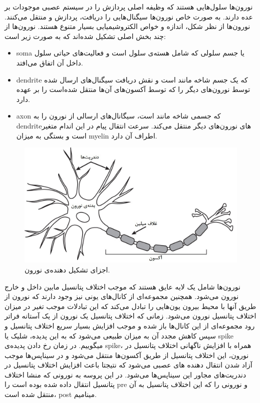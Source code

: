 \documentclass[12pt]{report}
\begin{document}
	نورون‌ها سلول‌هایی هستند که وظیفه اصلی پردازش را در سیستم عصبی موجودات بر عده دارند. به صورت خاص نورون‌ها سیگنال‌هایی را دریافت، پردازش و منتقل می‌کنند. نورون‌ها از نظر شکل، اندازه و خواص الکتروشیمیایی بسیار متنوع هستند. نورون‌ها از چند بخش اصلی تشکیل شده‌اند که به صورت زیر است:
	\begin{itemize}
		\item \gls{soma} یا جسم سلولی که شامل هسته‌ی سلول است و فعالیت‌های حیاتی سلول داخل آن اتفاق می‌افتد.
		\item \gls{dendrite} که یک جسم شاخه مانند است و نقش دریافت سیگنال‌های ارسال شده توسط نورون‌های دیگر را که توسط آکسون‌های آن‌ها منتقل شده‌است را بر عهده دارد.
		\item \gls{axon} که جسمی شاخه مانند است، سیگانال‌های ارسالی از نورون را به \gls{dendrite}‌های نورون‌های دیگر منتقل می‌کند. سرعت انتقال پیام‌‌ در این اندام متغیر است و بستگی به میزان \gls{myelin} اطراف آن دارد.
	\end{itemize}
	
	\begin{figure}[H]
		\centering
		\includegraphics[width=0.7\linewidth]{neuron.jpg}
		\caption[NS]{
			اجزای تشکیل دهنده‌ی نورون\footnotemark.
		}
		\label{fig:neuron}
	\end{figure}
	
	
	
	نورون‌ها شامل یک لایه عایق هستند که موجب اختلاف پتانسیل مابین داخل و خارج نورون می‌شود. همچنین مجموعه‌ای از کانال‌های یونی نیز وجود دارند که نورون از طریق آنها با محیط بیرون یون‌هایی را تبادل می‌کند که این تبادلات موجب تغیر در میزان اختلاف پتانسیل نورون می‌شود. زمانی که اختلاف پتانسیل یک نورون از یک آستانه فراتر رود مجموعه‌ای از این کانال‌ها باز شده و موجب افزایش بسیار سریع اختلاف پتانسیل و سپس کاهش مجدد آن به میزان طبیعی می‌شود که به این پدیده، شلیک یا \gls{spike} میگوییم. در زمان رخ دادن پدیده‌ی \gls{spike}، همراه با افزایش ناگهانی اختلاف پتانسیل در نورون، این اختلاف پتانسیل از طریق آکسون‌ها منتقل می‌شود و در سیناپس‌ها موجب آزاد شدن انتقال دهنده های عصبی می‌شود که نتیجتا باعث افزایش اختلاف پتانسیل در دندریت‌های مجاور این سیناپس‌ها می‌شود. در این پروسه به نورونی که منشا اختلاف پتانسیل انتقال داده شده بوده است را \gls{pre}‌ و نورونی را که این اختلاف پتانسیل به آن منتقل شده است، \gls{post}‌ مینامیم.
	
\end{document}
